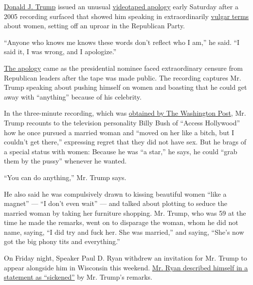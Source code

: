 \href{http://www.nytimes.com/2016/10/09/us/politics/donald-trump-campaign.html}{Donald
J. Trump} issued an unusual
\href{http://www.nytimes.com/video/us/politics/100000004698416/trump-responds-to-outrage-over-lewd-remarks.html}{videotaped
apology} early Saturday after a 2005 recording surfaced that showed him
speaking in extraordinarily
\href{http://www.nytimes.com/2016/10/08/us/donald-trump-tape-transcript.html}{vulgar
terms} about women, setting off an uproar in the Republican Party.

``Anyone who knows me knows these words don't reflect who I am,'' he
said. ``I said it, I was wrong, and I apologize.''

\href{http://www.nytimes.com/2016/10/08/us/politics/donald-trump-apology.html}{The
apology} came as the presidential nominee faced extraordinary censure
from Republican leaders after the tape was made public. The recording
captures Mr. Trump speaking about pushing himself on women and boasting
that he could get away with ``anything'' because of his celebrity.

In the three-minute recording, which was
\href{https://www.washingtonpost.com/politics/trump-recorded-having-extremely-lewd-conversation-about-women-in-2005/2016/10/07/3b9ce776-8cb4-11e6-bf8a-3d26847eeed4_story.html}{obtained
by The Washington Post}, Mr. Trump recounts to the television
personality Billy Bush of ``Access Hollywood'' how he once pursued a
married woman and ``moved on her like a bitch, but I couldn't get
there,'' expressing regret that they did not have sex. But he brags of a
special status with women: Because he was ``a star,'' he says, he could
``grab them by the pussy'' whenever he wanted.

``You can do anything,'' Mr. Trump says.

He also said he was compulsively drawn to kissing beautiful women ``like
a magnet'' --- ``I don't even wait'' --- and talked about plotting to
seduce the married woman by taking her furniture shopping. Mr. Trump,
who was 59 at the time he made the remarks, went on to disparage the
woman, whom he did not name, saying, ``I did try and fuck her. She was
married,'' and saying, ``She's now got the big phony tits and
everything.''

On Friday night, Speaker Paul D. Ryan withdrew an invitation for Mr.
Trump to appear alongside him in Wisconsin this weekend.
\href{http://www.nytimes.com/interactive/2016/10/08/us/politics/how-paul-ryan-and-mitch-mcconnell-have-disavowed-trumps-words-but-not-their-support.html}{Mr.
Ryan described himself in a statement as ``sickened''} by Mr. Trump's
remarks.

